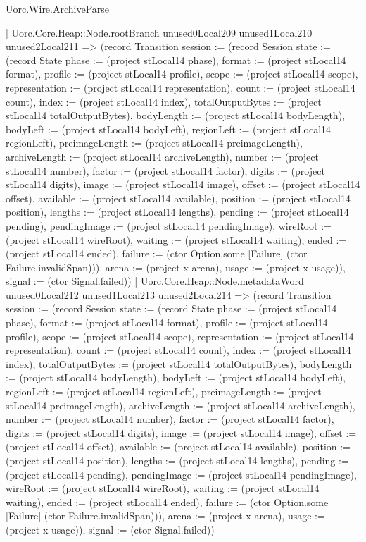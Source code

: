 \begin{lexlean}{Uorc.Wire.ArchiveParse}
\begin{semanticmodule}
{            | Uorc.Core.Heap::Node.rootBranch unused0Local209 unused1Local210 unused2Local211 => (record Transition {session := (record Session {state := (record State {phase := (project stLocal14 phase), format := (project stLocal14 format), profile := (project stLocal14 profile), scope := (project stLocal14 scope), representation := (project stLocal14 representation), count := (project stLocal14 count), index := (project stLocal14 index), totalOutputBytes := (project stLocal14 totalOutputBytes), bodyLength := (project stLocal14 bodyLength), bodyLeft := (project stLocal14 bodyLeft), regionLeft := (project stLocal14 regionLeft), preimageLength := (project stLocal14 preimageLength), archiveLength := (project stLocal14 archiveLength), number := (project stLocal14 number), factor := (project stLocal14 factor), digits := (project stLocal14 digits), image := (project stLocal14 image), offset := (project stLocal14 offset), available := (project stLocal14 available), position := (project stLocal14 position), lengths := (project stLocal14 lengths), pending := (project stLocal14 pending), pendingImage := (project stLocal14 pendingImage), wireRoot := (project stLocal14 wireRoot), waiting := (project stLocal14 waiting), ended := (project stLocal14 ended), failure := (ctor Option.some [Failure] (ctor Failure.invalidSpan))}), arena := (project x arena), usage := (project x usage)}), signal := (ctor Signal.failed)})
            | Uorc.Core.Heap::Node.metadataWord unused0Local212 unused1Local213 unused2Local214 => (record Transition {session := (record Session {state := (record State {phase := (project stLocal14 phase), format := (project stLocal14 format), profile := (project stLocal14 profile), scope := (project stLocal14 scope), representation := (project stLocal14 representation), count := (project stLocal14 count), index := (project stLocal14 index), totalOutputBytes := (project stLocal14 totalOutputBytes), bodyLength := (project stLocal14 bodyLength), bodyLeft := (project stLocal14 bodyLeft), regionLeft := (project stLocal14 regionLeft), preimageLength := (project stLocal14 preimageLength), archiveLength := (project stLocal14 archiveLength), number := (project stLocal14 number), factor := (project stLocal14 factor), digits := (project stLocal14 digits), image := (project stLocal14 image), offset := (project stLocal14 offset), available := (project stLocal14 available), position := (project stLocal14 position), lengths := (project stLocal14 lengths), pending := (project stLocal14 pending), pendingImage := (project stLocal14 pendingImage), wireRoot := (project stLocal14 wireRoot), waiting := (project stLocal14 waiting), ended := (project stLocal14 ended), failure := (ctor Option.some [Failure] (ctor Failure.invalidSpan))}), arena := (project x arena), usage := (project x usage)}), signal := (ctor Signal.failed)})
}
\end{semanticmodule}
\end{lexlean}
